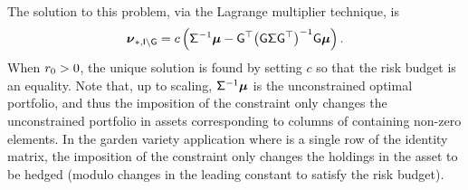 \documentclass[10pt,a4paper,english]{article}
\theoremstyle{plain}
\theoremstyle{definition}
\theoremstyle{remark}
\begin{document}
The
solution to this problem, via the Lagrange multiplier technique,
is
\begin{equation*}
\pportwoptHej{\hejG}
= c \wrapParens{\minv{\pvsig}{\pvmu} -
  \qiform{\wrapParens{\qoform{\pvsig}{\hejG}}}{\hejG}\pvmu}.
\end{equation*}
When $\rfr > 0$, the unique solution is found by setting $c$ so that the risk budget is an equality.
Note that, up to scaling, $\minv{\pvsig}\pvmu$ is the unconstrained optimal
portfolio, and thus the imposition of the \hejG constraint only changes
the unconstrained portfolio in assets corresponding to columns of \hejG 
containing non-zero elements. In the garden variety application where
\hejG is a single row of the identity matrix, the imposition of the
constraint only changes the holdings in the asset to be hedged (modulo
changes in the leading constant to satisfy the risk budget).

\end{document}
